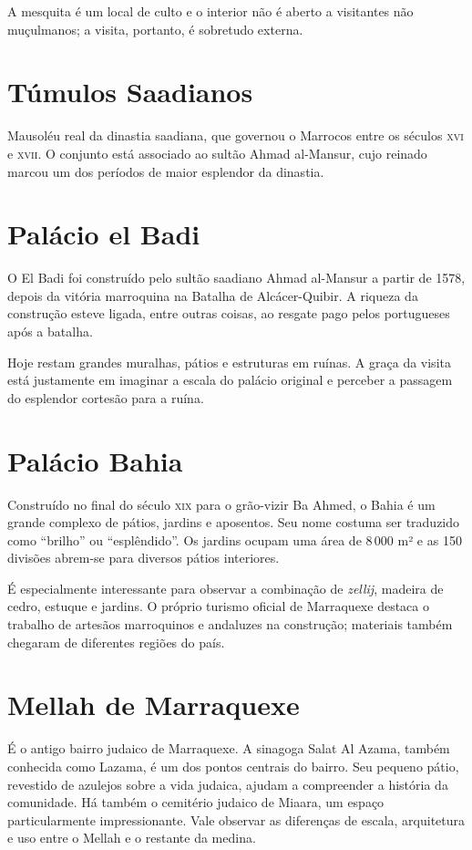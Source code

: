 A mesquita é um local de culto e o interior não é aberto a visitantes não muçulmanos; a visita, portanto, é sobretudo externa.

\chapter{Túmulos Saadianos} 

Mausoléu real da dinastia saadiana, que governou o Marrocos entre os séculos \textsc{xvi} e \textsc{xvii}. O conjunto está associado ao sultão Ahmad al-Mansur, cujo reinado marcou um dos períodos de maior esplendor da dinastia.

\chapter{Palácio el Badi}

O El Badi foi construído pelo sultão saadiano Ahmad al-Mansur a partir de 1578, depois da vitória marroquina na Batalha de Alcácer-Quibir. A riqueza da construção esteve ligada, entre outras coisas, ao resgate pago pelos portugueses após a \mbox{batalha.}

Hoje restam grandes muralhas, pátios e estruturas em ruínas. A graça da visita está justamente em imaginar a escala do palácio original e perceber a passagem do esplendor cortesão para a ruína.

\chapter{Palácio Bahia}

Construído no final do século \textsc{xix} para o grão-vizir Ba Ahmed, o Bahia é um grande complexo de pátios, jardins e aposentos. Seu nome costuma ser traduzido como ``brilho'' ou ``esplêndido''. Os jardins ocupam uma área de 8\,000 m² e as 150 divisões abrem-se para diversos pátios interiores.

É especialmente interessante para observar a combinação de \textit{zellij}, madeira de cedro, estuque e jardins. O próprio turismo oficial de Marraquexe destaca o trabalho de artesãos marroquinos e andaluzes na construção; materiais também chegaram de diferentes regiões do país.

\chapter{Mellah de Marraquexe}

É o antigo bairro judaico de Marraquexe. A sinagoga Salat Al Azama, também conhecida como Lazama, é um dos pontos centrais do bairro. Seu pequeno pátio, revestido de azulejos sobre a vida judaica, ajudam a compreender a história da comunidade. Há também o cemitério judaico de Miaara, um espaço particularmente impressionante. Vale observar as diferenças de escala, arquitetura e uso entre o Mellah e o restante da medina.

